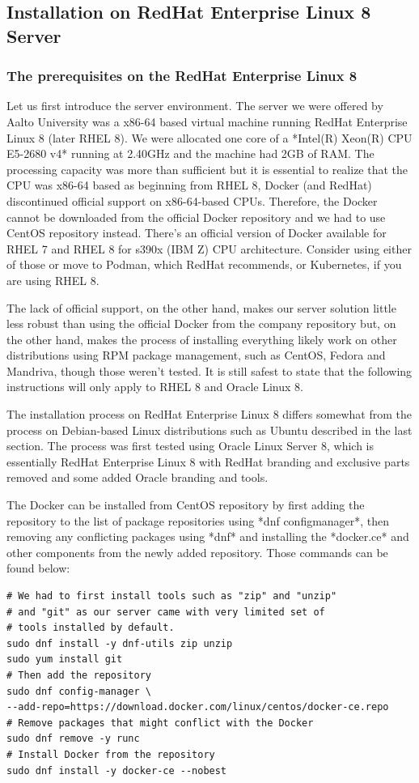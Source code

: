 \documentclass{article}
\begin{document}
\subsection{Installation on RedHat Enterprise Linux 8 Server}
\subsubsection{The prerequisites on the RedHat Enterprise Linux 8}\label{sec:serverEnv}
\begin{markdown}
Let us first introduce the server environment. The server we were offered by Aalto University was a x86-64 based virtual machine running RedHat Enterprise Linux 8 (later RHEL 8). We were allocated one core of a *Intel(R) Xeon(R) CPU E5-2680 v4* running at 2.40GHz and the machine had 2GB of RAM. The processing capacity was more than sufficient but it is essential to realize that the CPU was x86-64 based as beginning from RHEL 8, Docker (and RedHat) discontinued official support on x86-64-based CPUs. Therefore, the Docker cannot be downloaded from the official Docker repository and we had to use CentOS repository instead. There's an official version of Docker available for RHEL 7 and RHEL 8 for s390x (IBM Z) CPU architecture. Consider using either of those or move to Podman, which RedHat recommends, or Kubernetes, if you are using RHEL 8.

The lack of official support, on the other hand, makes our server solution little less robust than using the official Docker from the company repository but, on the other hand, makes the process of installing everything likely work on other distributions using RPM package management, such as CentOS, Fedora and Mandriva, though those weren't tested. It is still safest to state that the following instructions will only apply to RHEL 8 and Oracle Linux 8.   

The installation process on RedHat Enterprise Linux 8 differs somewhat from the process on Debian-based Linux distributions such as Ubuntu described in the last section. The process was first tested using Oracle Linux Server 8, which is essentially RedHat Enterprise Linux 8 with RedHat branding and exclusive parts removed and some added Oracle branding and tools.  

The Docker can be installed from CentOS repository by first adding the repository to the list of package repositories using *dnf configmanager*, then removing any conflicting packages using *dnf* and installing the *docker.ce* and other components from the newly added repository. Those commands can be found below:   
\end{markdown}
\begin{verbatim}
# We had to first install tools such as "zip" and "unzip" 
# and "git" as our server came with very limited set of
# tools installed by default.
sudo dnf install -y dnf-utils zip unzip
sudo yum install git
# Then add the repository
sudo dnf config-manager \
--add-repo=https://download.docker.com/linux/centos/docker-ce.repo
# Remove packages that might conflict with the Docker
sudo dnf remove -y runc
# Install Docker from the repository
sudo dnf install -y docker-ce --nobest
\end{verbatim}
\end{document}
